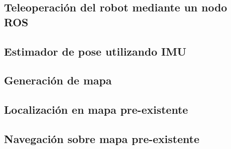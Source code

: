\subsection{Teleoperación del robot mediante un nodo ROS}

\subsection{Estimador de pose utilizando IMU}

\subsection{Generación de mapa}

\subsection{Localización en mapa pre-existente}

\subsection{Navegación sobre mapa pre-existente}

\label{sec:pruebasIN}